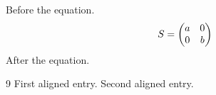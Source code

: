 \documentclass[12pt]{article}
\def\beq{\begin{eqnarray}}
\def\eeq{\end{eqnarray}}
\begin{document}
Before the equation.
\beq
S = \mqty( a &0 \\ 0 &b )
\eeq
After the equation.
\begin{thebibliography}{9}
 First aligned entry.
 Second aligned entry.
\end{thebibliography}
\end{document}
